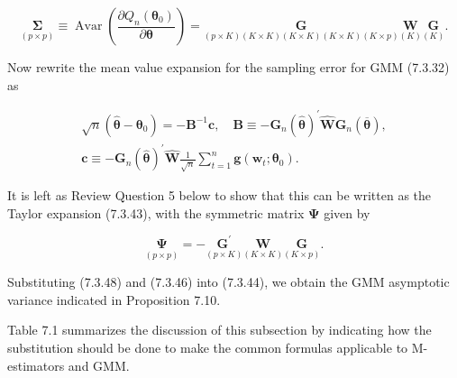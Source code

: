 \documentclass[10pt]{article}
\begin{document}
\begin{equation*}
\underset{(p \times p)}{\boldsymbol{\Sigma}} \equiv \operatorname{Avar}\left(\frac{\partial Q_{n}\left(\boldsymbol{\theta}_{0}\right)}{\partial \boldsymbol{\theta}}\right)=\underset{(p \times K)(K \times K)(K \times K)(K \times K)(K \times p)}{\mathbf{G}} \underset{(K)}{\mathbf{W}} \underset{(K)}{\mathbf{G}} . \tag{7.3.46}
\end{equation*}


Now rewrite the mean value expansion for the sampling error for GMM (7.3.32) as


\begin{gather*}
\sqrt{n}\left(\hat{\boldsymbol{\theta}}-\boldsymbol{\theta}_{0}\right)=-\mathbf{B}^{-1} \mathbf{c}, \quad \mathbf{B} \equiv-\mathbf{G}_{n}(\hat{\boldsymbol{\theta}})^{\prime} \widehat{\mathbf{W}} \mathbf{G}_{n}(\overline{\boldsymbol{\theta}}), \\
\mathbf{c} \equiv-\mathbf{G}_{n}(\hat{\boldsymbol{\theta}})^{\prime} \widehat{\mathbf{W}} \frac{1}{\sqrt{n}} \sum_{t=1}^{n} \mathbf{g}\left(\mathbf{w}_{t} ; \boldsymbol{\theta}_{0}\right) . \tag{7.3.47}
\end{gather*}


It is left as Review Question 5 below to show that this can be written as the Taylor expansion (7.3.43), with the symmetric matrix $\boldsymbol{\Psi}$ given by


\begin{equation*}
\underset{(p \times p)}{\boldsymbol{\Psi}}=-\underset{(p \times K)}{\mathbf{G}^{\prime}} \underset{(K \times K)}{\mathbf{W}} \underset{(K \times p)}{\mathbf{G}} . \tag{7.3.48}
\end{equation*}


Substituting (7.3.48) and (7.3.46) into (7.3.44), we obtain the GMM asymptotic variance indicated in Proposition 7.10.

Table 7.1 summarizes the discussion of this subsection by indicating how the substitution should be done to make the common formulas applicable to M-estimators and GMM.
\end{document}
